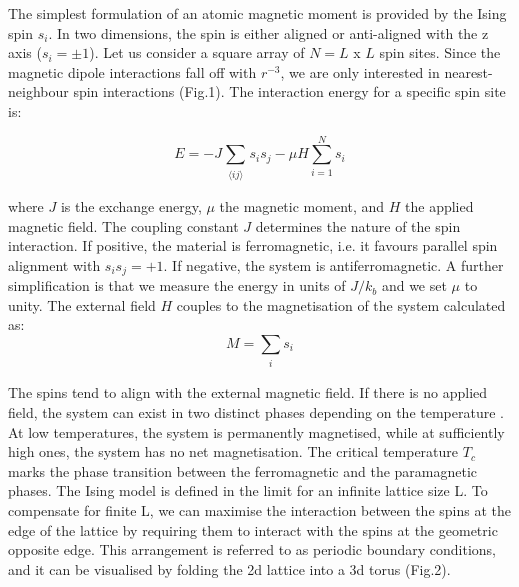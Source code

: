 \documentclass[a4paper]{article}
\begin{document}
The simplest formulation of an atomic magnetic moment is provided by the Ising spin $s_i$. In two dimensions, the spin is either aligned or anti-aligned with the z axis ($s_i = \pm 1$). Let us consider a square array of $N = L$ x $L$ spin sites. Since the magnetic dipole interactions fall off with $r^{-3}$, we are only interested in nearest-neighbour spin interactions (Fig.1). The interaction energy for a specific spin site is:

\begin{equation}
E = -J \sum_{\substack{ \langle ij \rangle}}s_i s_j -\mu H \sum\limits_{i = 1}^N s_i
\end{equation}



where $J$ is the exchange energy, $\mu$ the magnetic moment, and $H$ the applied magnetic field. The coupling constant $J$ determines the nature of the spin interaction. If positive, the material is ferromagnetic, i.e. it favours parallel spin alignment with $s_i s_j = +1$. If negative, the system is antiferromagnetic. A further simplification is that we measure the energy in units of $J/k_b$ and we set $\mu$ to unity. The external field $H$ couples to the magnetisation of the system calculated as:
\begin{equation}
M =  \sum_{\substack{i}}s_i
\end{equation}

The spins tend to align with the external magnetic field. If there is no applied field, the system can exist in two distinct phases depending on the temperature \cite{stat}. At low temperatures, the system is permanently magnetised, while at sufficiently high ones, the system has no net magnetisation. The critical temperature $T_c$ marks the phase transition between the ferromagnetic and the paramagnetic phases. The Ising model is defined in the limit for an infinite lattice size L. To compensate for finite L, we can maximise the interaction between the spins at the edge of the lattice by requiring them to interact with the spins at the geometric opposite edge. This arrangement is referred to as periodic boundary conditions, and it can be visualised by folding the 2d lattice into a 3d torus (Fig.2).
\end{document}
